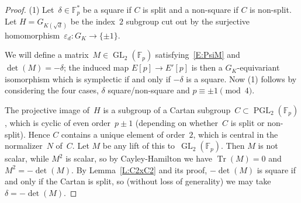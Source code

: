 \documentclass[12pt, reqno]{amsart}
\newcommand{\F}{\mathbb{F}}
\newcommand{\rhobar}{{\overline{\rho}}}
\DeclareMathOperator{\Tr}{Tr}
\newcommand{\GL}{\operatorname{GL}}
\newcommand{\PGL}{\operatorname{PGL}}
\numberwithin{equation}{section}
\theoremstyle{definition}
\theoremstyle{remark}
\newcommand{\nf}[1]{{\color{blue} \textsf{[NF: #1]}}}
\newcommand{\jc}[1]{{\color{darkgreen} \textsf{[JC: #1]}}}
\begin{document}
\begin{proof} (1)
Let~$\delta \in \F_p^*$ be a square if $C$ is split and a non-square
if $C$ is non-split.  Let $H=G_{K(\sqrt{d})}$ be the index~$2$
subgroup cut out by the surjective
homomorphism~$\varepsilon_d:G_K\to\{\pm 1 \}$.

\begin{comment}
\nf{Nuno's version:}

From the hypothesis we can 
choose a basis $P_1, P_2$ of $E[p]$ such that 
$\rhobar_{E,p}$ has image 
contained in the subgroup of $\GL_2(\F_p)$ given by 
\[
\left\{ 
\begin{pmatrix}
a & b\delta \\
b & a
\end{pmatrix}, 
\begin{pmatrix}
a & b\delta \\
-b & -a
\end{pmatrix}  \; : a, b \in \F_p, \; a^2 - \delta b^2 \neq 0 \right\},
\]
where~$C$ is given by the first type of matrices. 
Restricting~\eqref{E:PsiM} to $H$, we see that 
that~$M \in C$ because $\rhobar_{E,p}(H) \subset C$; also, $M$ 
is non-scalar since the twist is non-trivial,
thus~$b \neq 0$. 
Moreover, for $\tau \in G_K - H$ we have 
$M \rhobar_{E,p}(\tau) M^{-1} =-\rhobar_{E,p}(\tau)$ and so $M^2$ commutes with 
$\rhobar_{E,p}(\tau)$, thus it commutes with the whole (non-abelian) image 
of~$\rhobar_{E,p}$. Thus $M^2$ is scalar, hence 
$M$ has projective order~$2$ and so it has trace 0.

We conclude that $\Tr M = 2a = 0$, so $a=0$ (as $p \neq 2$) and $\det
M = -b^2\delta$. Thus $\det M$ is a square mod~$p$ if and only
if~$-\delta$ is a square. Part (1) follows by dividing this condition
into the four different cases.

\jc{John's version:}
\end{comment}
We will define a matrix~$M\in\GL_2(\F_p)$ satisfying~\eqref{E:PsiM}
and $\det(M)=-\delta$; the induced map $E[p]\to E'[p]$ is then a
$G_K$-equivariant isomorphism which is symplectic if and only if
$-\delta$ is a square.  Now (1) follows by considering the four cases,
$\delta$ square/non-square and $p\equiv\pm1\pmod4$.

The projective image of~$H$ is a subgroup of a Cartan
subgroup~$C\subset\PGL_2(\F_p)$, which is cyclic of even order~$p\pm1$
(depending on whether~$C$ is split or non-split).  Hence $C$ contains
a unique element of order~$2$, which is central in the normalizer~$N$
of~$C$.  Let $M$ be any lift of this to~$\GL_2(\F_p)$.  Then $M$ is
not scalar, while $M^2$ is scalar, so by Cayley-Hamilton we have
$\Tr(M)=0$ and $M^2=-\det(M)$.  By Lemma~\ref{L:C2xC2} and its proof,
$-\det(M)$ is square if and only if the Cartan is split, so (without
loss of generality) we may take $\delta=-\det(M)$.


\end{proof}
\end{document}

